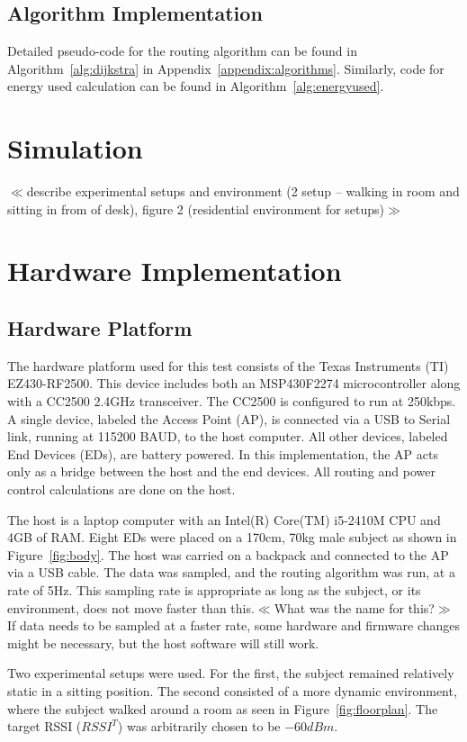 \documentclass{article}
\begin{document}
\subsection{Algorithm Implementation}
Detailed pseudo-code for the routing algorithm can be found in Algorithm~\ref{alg:dijkstra} in Appendix~\ref{appendix:algorithms}. Similarly, code for energy used calculation can be found in Algorithm~\ref{alg:energyused}.

\section{Simulation}
$\ll$describe experimental setups and environment (2 setup – walking in room and sitting in from of desk), figure 2 (residential environment for setups)$\gg$

\section{Hardware Implementation}
\subsection{Hardware Platform}
The hardware platform used for this test consists of the Texas Instruments (TI) EZ430-RF2500. This device includes both an MSP430F2274 microcontroller along with a CC2500 2.4GHz transceiver. The CC2500 is configured to run at 250kbps.
A single device, labeled the Access Point (AP), is connected via a USB to Serial link, running at 115200 BAUD, to the host computer. All other devices, labeled End Devices (EDs), are battery powered. In this implementation, the AP acts only as a bridge between the host and the end devices. All routing and power control calculations are done on the host.

The host is a laptop computer with an Intel(R) Core(TM) i5-2410M CPU and 4GB of RAM. Eight EDs were placed on a 170cm, 70kg male subject as shown in Figure~\ref{fig:body}. The host was carried on a backpack and connected to the AP via a USB cable. The data was sampled, and the routing algorithm was run, at a rate of 5Hz. This sampling rate is appropriate as long as the subject, or its environment, does not move faster than this.$\ll$What was the name for this?$\gg$ If data needs to be sampled at a faster rate, some hardware and firmware changes might be necessary, but the host software will still work.

Two experimental setups were used. For the first, the subject remained relatively static in a sitting position. The second consisted of a more dynamic environment, where the subject walked around a room as seen in Figure~\ref{fig:floorplan}. The target RSSI ($RSSI^T$) was arbitrarily chosen to be $-60 dBm$.
\end{document}
